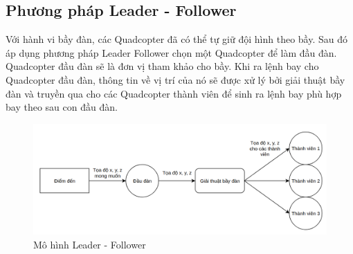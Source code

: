         \subsection{Phương pháp Leader - Follower} 
        Với hành vi bầy đàn, các Quadcopter đã có thể tự giữ đội hình theo bầy. Sau đó áp dụng phương pháp Leader Follower chọn một Quadcopter để làm đầu đàn. Quadcopter đầu đàn sẽ là đơn vị tham khảo cho bầy. Khi ra lệnh bay cho Quadcopter đầu đàn, thông tin về vị trí của nó sẽ được xử lý bởi giải thuật bầy đàn và truyền qua cho các Quadcopter thành viên để sinh ra lệnh bay phù hợp bay theo sau con đầu đàn. 
        \begin{figure}[h!]
	        	\begin{center}
	        		\includegraphics[scale=0.3]{images/leaderfollower.png}
	        		\caption{Mô hình Leader - Follower}
	        	\end{center}
        \end{figure}